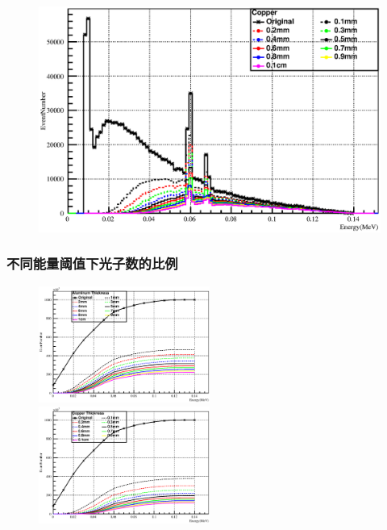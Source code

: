 \documentclass{beamer}
\begin{document}
\begin{CJK*}{UTF8}{gkai}
\begin{frame}
\begin{minipage}[t]{0.7\textwidth}
\begin{figure}[ht]
	\includegraphics[width=\textwidth,height=0.58\textwidth]{140keVelectronEnergyAfterCopperApron.eps}
      \end{figure}
    \end{minipage}
  \end{frame}
  \begin{frame}\frametitle{不同能量阈值下光子数的比例}
    \begin{figure}[ht]
      \includegraphics[width=0.5\textwidth]{140keVElectronXrayAluminumDistribution.eps}~
      \includegraphics[width=0.5\textwidth]{140keVElectronXrayCopperDistribution.eps}


\end{figure}
\end{frame}
\end{CJK*}
\end{document}

